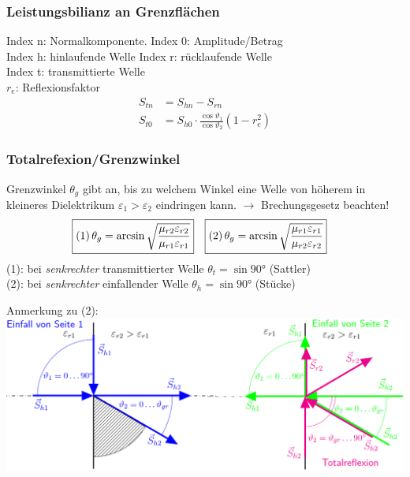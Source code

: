 \subsubsection{Leistungsbilianz an Grenzflächen}
Index n: Normalkomponente. \quad Index 0: Amplitude/Betrag\\
Index h: hinlaufende Welle \quad Index r: rücklaufende Welle\\
Index t: transmittierte Welle\\
$r_e$: Reflexionsfaktor
\begin{align*}
	S_{tn} & = S_{hn} - S_{rn}                                                  \\
	S_{t0} & = S_{h0}\cdot \frac{\cos\vartheta_{1}}{\cos\vartheta_{2}}(1-r_e^2)
\end{align*}

\newcolumn
\subsubsection{Totalrefexion/Grenzwinkel}
Grenzwinkel $ \theta_g $ gibt an, bis zu welchem Winkel eine Welle von höherem in kleineres Dielektrikum $ \varepsilon_1 > \varepsilon_2 $ eindringen kann. $ \rightarrow $ Brechungsgesetz beachten!
\begin{align*}
	\Aboxed{(1) \, \theta_g & = \arcsin \sqrt{\frac{\mu_{r2}\varepsilon_{r2}}{\mu_{r1}\varepsilon_{r1}}} }    &
	\Aboxed{(2) \, \theta_g & = \arcsin \sqrt{ \dfrac{\mu_{r1} \varepsilon_{r1}}{\mu_{r2} \varepsilon_{r2}}}} &
\end{align*}
(1): bei \textit{senkrechter} transmittierter Welle $ \theta_t = \sin \ang{90}$ (Sattler)\\
(2): bei \textit{senkrechter} einfallender Welle $ \theta_h = \sin \ang{90}$ (Stücke)

Anmerkung zu (2):\\
\includegraphics[width=\columnwidth]{Figures/Grenzwinkel_Bild.png}

